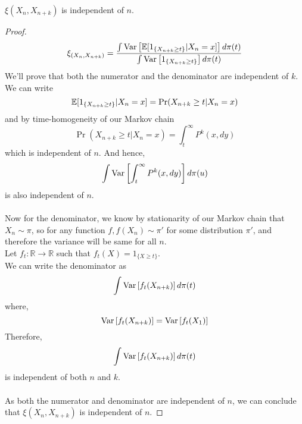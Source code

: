 \begin{theorem}
    $\xi(X_n, X_{n+k})$ is independent of $n$.
    \begin{proof}
        \begin{equation}
            \xi_{(X_n, X_{n+k})} = \frac{\int \text{Var}\left[{{\mathbb{E}[1_{\{X_{n+k} \geq t\}}|X_n=x]}}\right] d\pi(t)}{\int \text{Var}\left[{{1_{\{X_{n+k} \geq t\}}}}\right] d\pi(t)}
        \end{equation}
        We'll prove that both the numerator and the denominator are independent of $k$. \\
        We can write
        \begin{equation*}
            \mathbb{E}[1_{\{X_{n+k} \geq t\}}|X_n=x] = \Pr(X_{n+k} \geq t|X_n=x) \\
        \end{equation*}
        and by time-homogeneity of our Markov chain
        \begin{equation*}
            \Pr(X_{n+k} \geq t|X_n=x) = \int_t^{\infty} P^k(x, dy)
        \end{equation*}
        which is independent of $n$. And hence,
        \begin{equation}
            \int \text{Var}\left[{{\int_t^{\infty} P^k(x, dy)}}\right] d\pi(u)
        \end{equation}
        is also independent of $n$.\\\\
        Now for the denominator, we know by stationarity of our Markov chain that $X_n \sim \pi$, so for any function $f, f(X_n) \sim \pi'$ for some distribution $\pi'$, and therefore the variance will be same for all $n$.\\
        Let $f_t: \mathbb{R} \rightarrow \mathbb{R}$ such that $f_t(X) = 1_{\{X \geq t\}}$.\\
        We can write the denominator as
        $$\int \text{Var}\left[{{f_t(X_{n+k})}}\right] d\pi(t)$$
        where,
        $$\text{Var}\left[{{f_t(X_{n+k})}}\right] = \text{Var}\left[{{f_t(X_{1})}}\right]$$
        Therefore,
        $$\int \text{Var}\left[{{f_t(X_{n+k})}}\right] d\pi(t)$$
        is independent of both $n$ and $k$.\\\\
        As both the numerator and denominator are independent of $n$, we can conclude that $\xi(X_n, X_{n+k})$ is independent of $n$.
    \end{proof}
\end{theorem}

